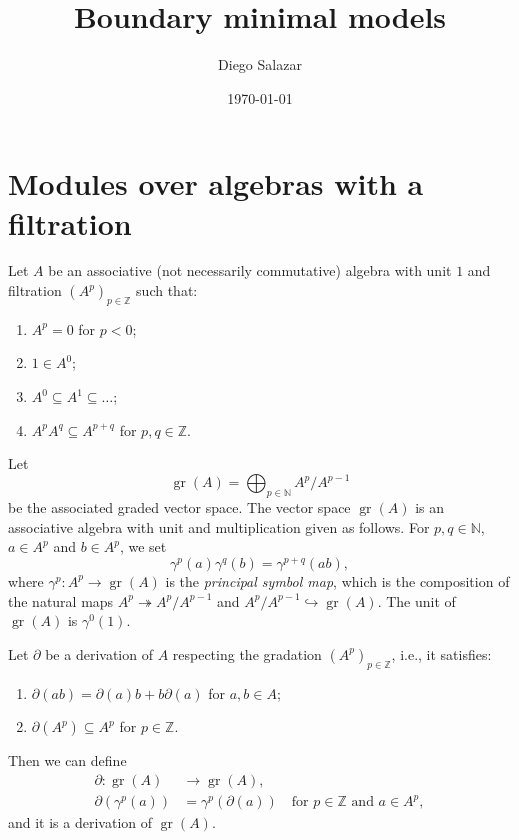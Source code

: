 \documentclass[a4paper, 12pt, reqno]{amsart}
\DeclareMathOperator{\gr}{gr}
\begin{document}
\title{Boundary minimal models}
\author{Diego Salazar}
\address{Instituto de Matemática Pura e Aplicada, Rio de Janeiro, RJ, Brazil}
\date{\today}
\maketitle

\section{Modules over algebras with a filtration}
\label{sec:modul-over-algebr}

Let $A$ be an associative (not necessarily commutative) algebra with unit $1$ and filtration $(A^p)_{p \in \mathbb{Z}}$ such that:
\begin{enumerate}
\item $A^p = 0$ for $p < 0$;
\item $1 \in A^0$;
\item $A^0 \subseteq A^1 \subseteq \dots$;
\item $A^pA^q \subseteq A^{p + q}$ for $p, q \in \mathbb{Z}$.
\end{enumerate}
Let
\begin{equation*}
  \gr(A) = \bigoplus_{p \in \mathbb{N}}A^p/A^{p - 1}
\end{equation*}
be the associated graded vector space.
The vector space $\gr(A)$ is an associative algebra with unit and multiplication given as follows.
For $p, q \in \mathbb{N}$, $a \in A^p$ and $b \in A^p$, we set
\begin{equation*}
  \gamma^p(a)\gamma^q(b) = \gamma^{p + q}(ab),
\end{equation*}
where $\gamma^p: A^p \to \gr(A)$ is the \emph{principal symbol map}, which is the composition of the natural maps $A^p \twoheadrightarrow A^p/A^{p - 1}$ and $A^p/A^{p - 1} \hookrightarrow \gr(A)$.
The unit of $\gr(A)$ is $\gamma^0(1)$.

Let $\partial$ be a derivation of $A$ respecting the gradation $(A^p)_{p \in \mathbb{Z}}$, i.e., it satisfies:
\begin{enumerate}
\item $\partial(ab) = \partial(a)b + b\partial(a)$ for $a, b \in A$;
\item $\partial(A^p) \subseteq A^p$ for $p \in \mathbb{Z}$.
\end{enumerate}
Then we can define
\begin{align*}
  \partial: \gr(A) &\to \gr(A), \\
  \partial(\gamma^p(a)) &= \gamma^p(\partial(a)) \quad \text{for $p \in \mathbb{Z}$ and $a \in A^p$},
\end{align*}
and it is a derivation of $\gr(A)$.
\end{document}
